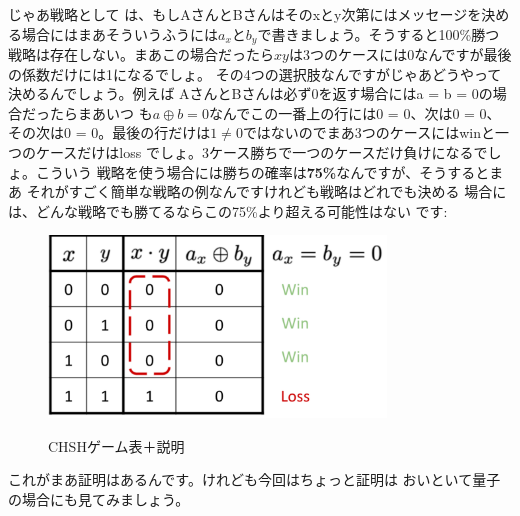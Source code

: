 じゃあ戦略として
は、もしAさんとBさんはそのxとy次第にはメッセージを決める場合にはまあそういうふうには$a_x$と$b_y$で書きましょう。そうすると100\%勝つ戦略は存在しない。まあこの場合だったら$x y$は3つのケースには0なんですが最後の係数だけには1になるでしょ。
その4つの選択肢なんですがじゃあどうやって決めるんでしょう。例えば
AさんとBさんは必ず0を返す場合にはa = b = 0の場合だったらまあいつ
も$a \oplus b = 0$なんでこの一番上の行には0 = 0、次は0 = 0、その次は0 = 0。最後の行だけは$1 \neq 0$ではないのでまあ3つのケースにはwinと一つのケースだけはloss
でしょ。3ケース勝ちで一つのケースだけ負けになるでしょ。こういう
戦略を使う場合には勝ちの確率は\textbf{75\%}なんですが、そうするとまあ
それがすごく簡単な戦略の例なんですけれども戦略はどれでも決める
場合には、どんな戦略でも勝てるならこの75\%より超える可能性はない
です:
\begin{figure}[H]
    \centering
    \includegraphics[width=0.8\textwidth]{lesson4/CHSH_annotated_table.pdf}
    \label{fig: 1}
    \begin{center}
        \caption{CHSHゲーム表＋説明}
    \end{center}
\end{figure}
これがまあ証明はあるんです。けれども今回はちょっと証明は
おいといて量子の場合にも見てみましょう。

